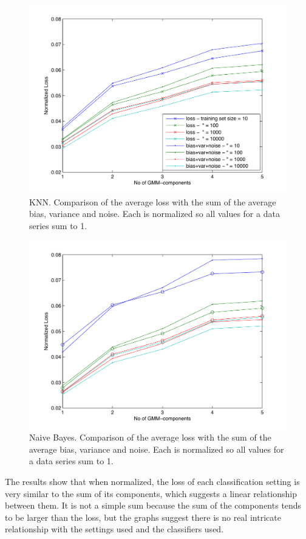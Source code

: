 \documentclass[a4paper]{article}
\begin{document}
\begin{figure}[H!]
    \centering
    \includegraphics[width=.9\textwidth]{5040_knn_losscomp.pdf}
    \caption{KNN. Comparison of the average loss with the sum of the average bias, variance and noise. Each is normalized so all values for a data series sum to 1. \label{fig:knnlosscomp}}
\end{figure}

\begin{figure}[H!]
    \centering
    \includegraphics[width=.9\textwidth]{5050_nb_losscomp.pdf}
    \caption{Naive Bayes. Comparison of the average loss with the sum of the average bias, variance and noise. Each is normalized so all values for a data series sum to 1. \label{fig:nblosscomp}}
\end{figure}

The results show that when normalized, the loss of each classification setting is very similar to the sum of its components, which suggests a linear relationship between them. It is not a simple sum because the sum of the components tends to be larger than the loss, but the graphs suggest there is no real intricate relationship with the settings used and the classifiers used.
\end{document}
